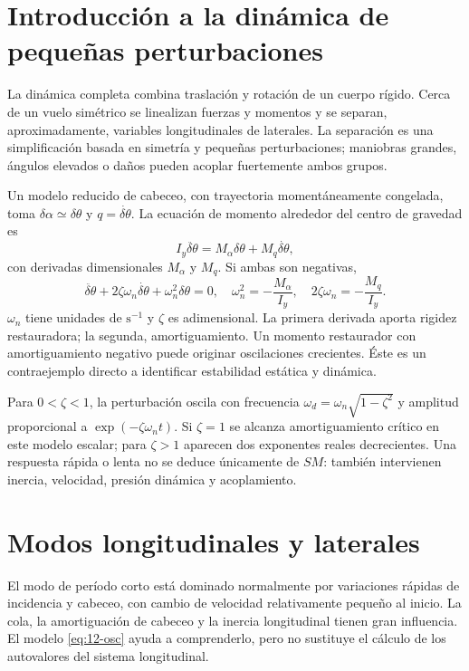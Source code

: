 \section{Introducción a la dinámica de pequeñas perturbaciones}
La dinámica completa combina traslación y rotación de un cuerpo rígido. Cerca de un vuelo simétrico se linealizan fuerzas y momentos y se separan, aproximadamente, variables longitudinales de laterales. La separación es una simplificación basada en simetría y pequeñas perturbaciones; maniobras grandes, ángulos elevados o daños pueden acoplar fuertemente ambos grupos.

Un modelo reducido de cabeceo, con trayectoria momentáneamente congelada, toma $\delta\alpha\simeq\delta\theta$ y $q=\dot{\delta\theta}$. La ecuación de momento alrededor del centro de gravedad es
\begin{equation}
I_y\ddot{\delta\theta}=M_\alpha\delta\theta+M_q\dot{\delta\theta},
\end{equation}
con derivadas dimensionales $M_\alpha$ y $M_q$. Si ambas son negativas,
\begin{equation}\label{eq:12-osc}
\ddot{\delta\theta}+2\zeta\omega_n\dot{\delta\theta}
+\omega_n^2\delta\theta=0,
\quad \omega_n^2=-\frac{M_\alpha}{I_y},\quad
2\zeta\omega_n=-\frac{M_q}{I_y}.
\end{equation}
$\omega_n$ tiene unidades de $\mathrm{s^{-1}}$ y $\zeta$ es adimensional. La primera derivada aporta rigidez restauradora; la segunda, amortiguamiento. Un momento restaurador con amortiguamiento negativo puede originar oscilaciones crecientes. Éste es un contraejemplo directo a identificar estabilidad estática y dinámica.

Para $0<\zeta<1$, la perturbación oscila con frecuencia $\omega_d=\omega_n\sqrt{1-\zeta^2}$ y amplitud proporcional a $\exp(-\zeta\omega_nt)$. Si $\zeta=1$ se alcanza amortiguamiento crítico en este modelo escalar; para $\zeta>1$ aparecen dos exponentes reales decrecientes. Una respuesta rápida o lenta no se deduce únicamente de $SM$: también intervienen inercia, velocidad, presión dinámica y acoplamiento.

\section{Modos longitudinales y laterales}
El modo de período corto está dominado normalmente por variaciones rápidas de incidencia y cabeceo, con cambio de velocidad relativamente pequeño al inicio. La cola, la amortiguación de cabeceo y la inercia longitudinal tienen gran influencia. El modelo \eqref{eq:12-osc} ayuda a comprenderlo, pero no sustituye el cálculo de los autovalores del sistema longitudinal.

